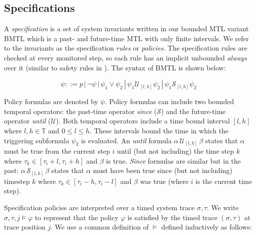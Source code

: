 \documentclass[]{llncs}
\begin{document}
\subsection{Specifications}
\label{sec:formal:spec}
A \emph{specification} is a set of system invariants written in our bounded MTL variant BMTL which is a past- and future-time MTL with only finite intervals.  
We refer to the invariants as the specification \emph{rules} or \emph{policies}. The specification rules are checked at every monitored step, so each rule has an implicit unbounded \emph{always} over it (similar to safety rules in \cite{Basin2008}). The syntax of BMTL is shown below:

$$\psi ::=  p \, | \,  \neg \psi \, | \,  \psi_1 \vee \psi_2 \, | \,  \psi_1 \mathcal{U}_{[l,h]} \psi_2 \, | \, \psi_1 \mathcal{S}_{[l,h]} \psi_2$$

Policy formulas are denoted by $\psi$. Policy formulas can include two bounded temporal operators: the past-time operator \emph{since} ($\mathcal{S}$) and the future-time operator \emph{until} ($\mathcal{U}$). 
Both temporal operators include a time bound interval $[l,h]$ where $l,h \in \mathbb{T}$ and $0 \leq l \leq h$. 
These intervals bound the time in which the triggering subformula $\psi_2$ is evaluated. 
An \emph{until} formula $\alpha\, \mathcal{U}_{[l,h]}\, \beta$ states that $\alpha$ must be true from the current step $i$ until (but not including) the time step $k$ where $\tau_k \in [\tau_i+l,\tau_i+h]$ and $\beta$ is true. 
\emph{Since} formulas are similar but in the past: $\alpha\, \mathcal{S}_{[l,h]}\, \beta$ states that $\alpha$ must have been true since (but not including) timestep $k$ where  $\tau_k \in [\tau_i-h,\tau_i-l]$ and $\beta$ was true (where $i$ is the current time step).

Specification policies are interpreted over a timed system trace $\sigma,\tau$. 
We write $\sigma, \tau, j \vDash \varphi$ to represent that the policy $\varphi$ is satisfied by the timed trace $(\sigma, \tau)$ at trace position $j$. We use a common definition of $\vDash$ defined inductively as follows:
\end{document}
